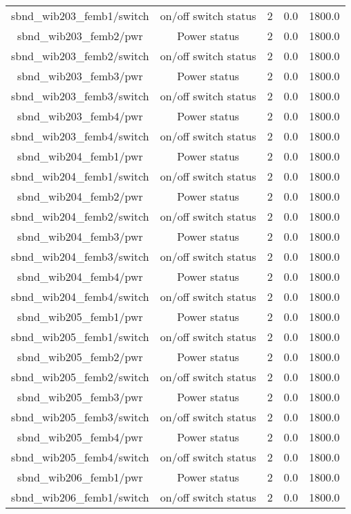 \begin{center}
\begin{longtable}{c | c c c c }
sbnd\_wib203\_femb1/switch & on/off switch status & 2 & 0.0 & 1800.0\\ 
sbnd\_wib203\_femb2/pwr & Power status & 2 & 0.0 & 1800.0\\ 
sbnd\_wib203\_femb2/switch & on/off switch status & 2 & 0.0 & 1800.0\\ 
sbnd\_wib203\_femb3/pwr & Power status & 2 & 0.0 & 1800.0\\ 
sbnd\_wib203\_femb3/switch & on/off switch status & 2 & 0.0 & 1800.0\\ 
sbnd\_wib203\_femb4/pwr & Power status & 2 & 0.0 & 1800.0\\ 
sbnd\_wib203\_femb4/switch & on/off switch status & 2 & 0.0 & 1800.0\\ 
sbnd\_wib204\_femb1/pwr & Power status & 2 & 0.0 & 1800.0\\ 
sbnd\_wib204\_femb1/switch & on/off switch status & 2 & 0.0 & 1800.0\\ 
sbnd\_wib204\_femb2/pwr & Power status & 2 & 0.0 & 1800.0\\ 
sbnd\_wib204\_femb2/switch & on/off switch status & 2 & 0.0 & 1800.0\\ 
sbnd\_wib204\_femb3/pwr & Power status & 2 & 0.0 & 1800.0\\ 
sbnd\_wib204\_femb3/switch & on/off switch status & 2 & 0.0 & 1800.0\\ 
sbnd\_wib204\_femb4/pwr & Power status & 2 & 0.0 & 1800.0\\ 
sbnd\_wib204\_femb4/switch & on/off switch status & 2 & 0.0 & 1800.0\\ 
sbnd\_wib205\_femb1/pwr & Power status & 2 & 0.0 & 1800.0\\ 
sbnd\_wib205\_femb1/switch & on/off switch status & 2 & 0.0 & 1800.0\\ 
sbnd\_wib205\_femb2/pwr & Power status & 2 & 0.0 & 1800.0\\ 
sbnd\_wib205\_femb2/switch & on/off switch status & 2 & 0.0 & 1800.0\\ 
sbnd\_wib205\_femb3/pwr & Power status & 2 & 0.0 & 1800.0\\ 
sbnd\_wib205\_femb3/switch & on/off switch status & 2 & 0.0 & 1800.0\\ 
sbnd\_wib205\_femb4/pwr & Power status & 2 & 0.0 & 1800.0\\ 
sbnd\_wib205\_femb4/switch & on/off switch status & 2 & 0.0 & 1800.0\\ 
sbnd\_wib206\_femb1/pwr & Power status & 2 & 0.0 & 1800.0\\ 
sbnd\_wib206\_femb1/switch & on/off switch status & 2 & 0.0 & 1800.0\\ 

\end{longtable}
\end{center}
